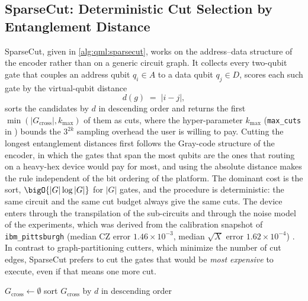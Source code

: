 \subsection{SparseCut: Deterministic Cut Selection by Entanglement Distance}\label{sec:qml:shardq:sparsecut}

SparseCut, given in \cref{alg:qml:sparsecut}, works on the address--data structure of the encoder rather than on a generic circuit graph. It collects every two-qubit gate that couples an address qubit $q_i\in A$ to a data qubit $q_j\in D$, scores each such gate by the virtual-qubit distance
\begin{equation}\label{eq:qml:sparsecut-score}
d(g) \;=\; \lvert i - j\rvert,
\end{equation}
sorts the candidates by $d$ in descending order and returns the first $\min(\lvert G_{\mathrm{cross}}\rvert, k_{\max})$ of them as cuts, where the hyper-parameter $k_{\max}$ (\texttt{max\_cuts} in \cite{guo2025shardq}) bounds the $3^{2k}$ sampling overhead the user is willing to pay. Cutting the longest entanglement distances first follows the Gray-code structure of the encoder, in which the gates that span the most qubits are the ones that routing on a heavy-hex device would pay for most, and using the absolute distance makes the rule independent of the bit ordering of the platform. The dominant cost is the sort, $\bigO{|G| \log |G|}$ for $|G|$ gates, and the procedure is deterministic: the same circuit and the same cut budget always give the same cuts. The device enters through the transpilation of the sub-circuits and through the noise model of the experiments, which was derived from the calibration snapshot of \texttt{ibm\_pittsburgh} (median CZ error $1.46\times10^{-3}$, median $\sqrt{X}$ error $1.62\times10^{-4}$) \cite{guo2025shardq}. In contrast to graph-partitioning cutters, which minimize the number of cut edges, SparseCut prefers to cut the gates that would be \emph{most expensive} to execute, even if that means one more cut.

\begin{algorithm}[htbp]
\caption{SparseCut: deterministic cut selection for address--data encoders (after Alg.~1 of \cite{guo2025shardq}).}\label{alg:qml:sparsecut}
$G_{\mathrm{cross}} \leftarrow \emptyset$\;
sort $G_{\mathrm{cross}}$ by $d$ in descending order 
\end{algorithm}

